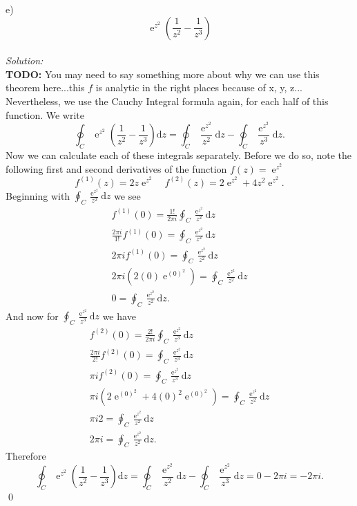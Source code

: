 \documentclass[10pt]{amsart}
\newcommand{\D}{\mathrm{d}}
\DeclareMathOperator{\E}{e}
\theoremstyle{nonumberplain}
\begin{document}
\begin{enumerate}[label={\bf {\arabic*}:}]
e)
$$
\E^{z^2}\left(\frac{1}{z^2} - \frac{1}{z^3}\right)
$$
\\
\textit{Solution:}\\
\textbf{TODO:} You may need to say something more about why we can use this theorem here...this $f$ is analytic in the right places because of x, y, z...
Nevertheless, we use the Cauchy Integral formula again, for each half of this function.
We write
$$
\oint_C \E^{z^2}\left(\frac{1}{z^2} - \frac{1}{z^3}\right) \D z
	= \oint_C \frac{\E^{z^2}}{z^2}\D z - \oint_C \frac{\E^{z^2}}{z^3} \D z.
$$
Now we can calculate each of these integrals separately.
Before we do so, note the following first and second derivatives of the function $f(z) = \E^{z^2}$
$$f^{(1)}(z) = 2z\E^{z^2} \quad f^{(2)}(z) = 2\E^{z^2} + 4z^2\E^{z^2}.$$
Beginning with $\oint_C \frac{\E^{z^2}}{z^2}\D z$ we see
\begin{align*}
f^{(1)}(0) = \frac{1!}{2\pi i} \oint_C \frac{\E^{z^2}}{z^2}\D z \\
\frac{2\pi i}{1!} f^{(1)}(0) = \oint_C \frac{\E^{z^2}}{z^2}\D z \\
2\pi i f^{(1)}(0) = \oint_C \frac{\E^{z^2}}{z^2}\D z \\
2\pi i\left( 2(0)\E^{(0)^2}\right) = \oint_C \frac{\E^{z^2}}{z^2}\D z \\
0 = \oint_C \frac{\E^{z^2}}{z^2}\D z.
\end{align*}
And now for $\oint_C \frac{\E^{z^2}}{z^3} \D z$ we have
\begin{align*}
f^{(2)}(0) = \frac{2!}{2\pi i} \oint_C \frac{\E^{z^2}}{z^3}\D z \\
\frac{2\pi i}{2!} f^{(2)}(0) = \oint_C \frac{\E^{z^2}}{z^3}\D z \\
\pi i f^{(2)}(0) = \oint_C \frac{\E^{z^2}}{z^3}\D z \\
\pi i \left(2\E^{(0)^2} + 4(0)^2\E^{(0)^2}\right) = \oint_C \frac{\E^{z^2}}{z^2}\D z \\
\pi i 2 = \oint_C \frac{\E^{z^2}}{z^2}\D z \\
2 \pi i = \oint_C \frac{\E^{z^2}}{z^2}\D z.
\end{align*}
Therefore
$$
\oint_C \E^{z^2}\left(\frac{1}{z^2} - \frac{1}{z^3}\right) \D z
	= \oint_C \frac{\E^{z^2}}{z^2}\D z - \oint_C \frac{\E^{z^2}}{z^3} \D z
	= 0 - 2 \pi i = - 2 \pi i.
$$
\qed
\end{enumerate}
\end{document}
